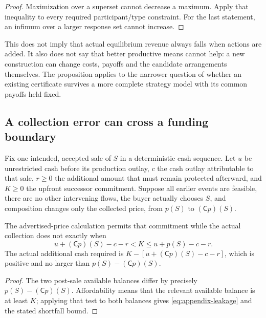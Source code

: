 \begin{proof}
Maximization over a superset cannot decrease a maximum. Apply that inequality to every required participant/type constraint. For the last statement, an infimum over a larger response set cannot increase.
\end{proof}

This does not imply that actual equilibrium revenue always falls when actions are added. It also does not say that better productive means cannot help: a new construction can change costs, payoffs and the candidate arrangements themselves. The proposition applies to the narrower question of whether an existing certificate survives a more complete strategy model with its common payoffs held fixed.

\subsection{A collection error can cross a funding boundary}\label{app:leakage}

\begin{proposition}\label{prop:leakage}
Fix one intended, accepted sale of $S$ in a deterministic cash sequence. Let $u$ be unrestricted cash before its production outlay, $c$ the cash outlay attributable to that sale, $r\ge0$ the additional amount that must remain protected afterward, and $K\ge0$ the upfront successor commitment. Suppose all earlier events are feasible, there are no other intervening flows, the buyer actually chooses $S$, and composition changes only the collected price, from $p(S)$ to $(\mathsf Cp)(S)$.

The advertised-price calculation permits that commitment while the actual collection does not exactly when
\begin{equation}
u+(\mathsf Cp)(S)-c-r<K\le u+p(S)-c-r.
\label{eq:appendix-leakage}
\end{equation}
The actual additional cash required is
$K-[u+(\mathsf Cp)(S)-c-r]$, which is positive and no larger than $p(S)-(\mathsf Cp)(S)$.
\end{proposition}

\begin{proof}
The two post-sale available balances differ by precisely
$p(S)-(\mathsf Cp)(S)$. Affordability means that the relevant available balance is at least $K$; applying that test to both balances gives \eqref{eq:appendix-leakage} and the stated shortfall bound.
\end{proof}

